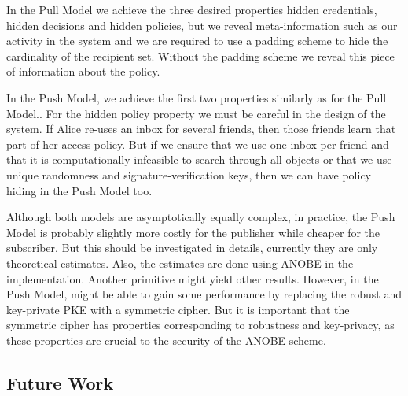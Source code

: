 In the Pull Model we achieve the three desired properties hidden credentials, 
hidden decisions and hidden policies, but we reveal meta-information such as 
our activity in the system and we are required to use a padding scheme to hide 
the cardinality of the recipient set.
Without the padding scheme we reveal this piece of information about the 
policy.

In the Push Model, we achieve the first two properties similarly as for the 
Pull Model..
For the hidden policy property we must be careful in the design of the system.
If Alice re-uses an inbox for several friends, then those friends learn that 
part of her access policy.
But if we ensure that we use one inbox per friend and that it is 
computationally infeasible to search through all objects or that we use unique 
randomness and signature-verification keys, then we can have policy hiding in 
the Push Model too.

Although both models are asymptotically equally complex, in practice, the Push 
Model is probably slightly more costly for the publisher while cheaper for the 
subscriber.
But this should be investigated in details, currently they are only theoretical 
estimates.
Also, the estimates are done using \ac{ANOBE} in the implementation.
Another primitive might yield other results.
However, in the Push Model, might be able to gain some performance by replacing 
the robust and key-private \ac{PKE} with a symmetric cipher.
But it is important that the symmetric cipher has properties corresponding to 
robustness and key-privacy, as these properties are crucial to the security of 
the \ac{ANOBE} scheme.

\subsection{Future Work}



